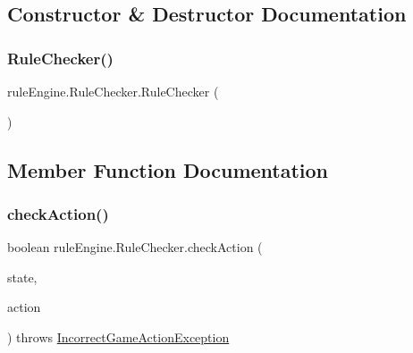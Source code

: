 \subsection{Constructor \& Destructor Documentation}
\mbox{\label{classrule_engine_1_1_rule_checker_a64ab60106f2bae480f613479bbdd0b1e}} 
\subsubsection{\texorpdfstring{Rule\+Checker()}{RuleChecker()}}
{\footnotesize\ttfamily rule\+Engine.\+Rule\+Checker.\+Rule\+Checker (\begin{DoxyParamCaption}{ }\end{DoxyParamCaption})\hspace{0.3cm}{\ttfamily [inline]}}



\subsection{Member Function Documentation}
\mbox{\label{classrule_engine_1_1_rule_checker_a8d948e5ff32b545244d251c57a59c117}} 
\subsubsection{\texorpdfstring{check\+Action()}{checkAction()}}
{\footnotesize\ttfamily boolean rule\+Engine.\+Rule\+Checker.\+check\+Action (\begin{DoxyParamCaption}\item[{\mbox{\hyperlink{classgame_1_1game_state_1_1_game_state}{Game\+State}}}]{state,  }\item[{\mbox{\hyperlink{classrule_engine_1_1_game_action}{Game\+Action}}}]{action }\end{DoxyParamCaption}) throws \mbox{\hyperlink{classrule_engine_1_1exceptions_1_1_incorrect_game_action_exception}{Incorrect\+Game\+Action\+Exception}}\hspace{0.3cm}{\ttfamily [inline]}}

